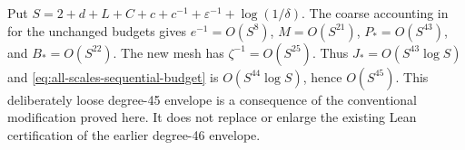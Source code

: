 \begin{remark}
Put $S=2+d+L+C+c+c^{-1}+\varepsilon^{-1}+\log(1/\delta)$.
The coarse accounting in~\cite{all-scales} for the unchanged budgets gives
$e^{-1}=O(S^8)$, $M=O(S^{21})$, $P_*=O(S^{43})$, and
$B_*=O(S^{22})$. The new mesh has
$\zeta^{-1}=O(S^{25})$. Thus $J_*=O(S^{43}\log S)$ and
\eqref{eq:all-scales-sequential-budget} is $O(S^{44}\log S)$,
hence $O(S^{45})$. This deliberately loose degree-45 envelope is a
consequence of the conventional modification proved here. It does not
replace or enlarge the existing Lean certification of the earlier
degree-46 envelope.
\end{remark}
